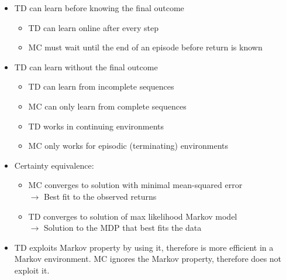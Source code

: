 \documentclass[10pt]{article}
\begin{document}
\begin{itemize}
\item TD can learn before knowing the final outcome
\begin{itemize}
\item TD can learn online after every step
\item MC must wait until the end of an episode before return is known
\end{itemize}
\item TD can learn without the final outcome
\begin{itemize}
\item TD can learn from incomplete sequences
\item MC can only learn from complete sequences
\item TD works in continuing environments
\item MC only works for episodic (terminating) environments
\end{itemize}
\item Certainty equivalence:
\begin{itemize}
\item MC converges to solution with minimal mean-squared error \\ $ \rightarrow$ Best fit to the observed returns
\item TD converges to solution of max likelihood Markov model \\ $ \rightarrow$ Solution to the MDP that best fits the data
\end{itemize}
\item TD exploits Markov property by using it, therefore is more efficient in a Markov environment. MC ignores the Markov property, therefore does not exploit it.
\end{itemize}
\end{document}
